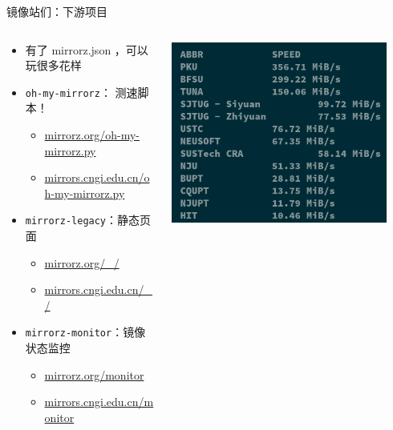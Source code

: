 \documentclass{ctexbeamer}
\newcommand{\T}[1]{\texttt{#1}}
\begin{document}
\begin{frame}{镜像站们：下游项目}
  \begin{columns}
    \begin{column}{0.6\textwidth}
      \begin{itemize}
        \item 有了 mirrorz.json ，可以玩很多花样
        \item \T{oh-my-mirrorz}： 测速脚本！\begin{itemize}
          \item \url{mirrorz.org/oh-my-mirrorz.py}
          \item \url{mirrors.cngi.edu.cn/oh-my-mirrorz.py}
        \end{itemize}
        \item \T{mirrorz-legacy}：静态页面\begin{itemize}
          \item \url{mirrorz.org/\_/}
          \item \url{mirrors.cngi.edu.cn/\_/}
        \end{itemize}
        \item \T{mirrorz-monitor}：镜像状态监控\begin{itemize}
          \item \url{mirrorz.org/monitor}
          \item \url{mirrors.cngi.edu.cn/monitor}
        \end{itemize}
      \end{itemize}
    \end{column}
    \begin{column}{0.4\textwidth}
      \includegraphics[width=0.9\textwidth]{img/speed.png}
    \end{column}
  \end{columns}
\end{frame}
\end{document}
